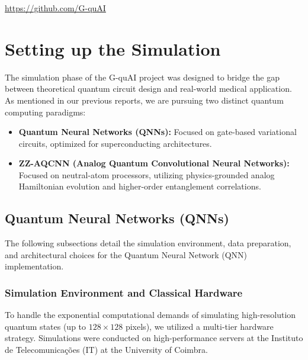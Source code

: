 \documentclass{oqireport}
\begin{document}
    \url {https://github.com/G-quAI}

\section{Setting up the Simulation}

The simulation phase of the G-quAI project was designed to bridge the gap between theoretical quantum circuit design and real-world medical application.\\
As mentioned in our previous reports, we are pursuing two distinct quantum computing paradigms:
\begin{itemize}
    \item \textbf{Quantum Neural Networks (QNNs):} Focused on gate-based variational circuits, optimized for superconducting architectures.
    \item \textbf{ZZ-AQCNN (Analog Quantum Convolutional Neural Networks):} Focused on neutral-atom processors, utilizing physics-grounded analog Hamiltonian evolution and higher-order entanglement correlations.
\end{itemize}

\subsection{Quantum Neural Networks (QNNs)}
The following subsections detail the simulation environment, data preparation, and architectural choices for the Quantum Neural Network (QNN) implementation.

\subsubsection{Simulation Environment and Classical Hardware}
To handle the exponential computational demands of simulating high-resolution quantum states (up to $128 \times 128$ pixels), we utilized a multi-tier hardware strategy. Simulations were conducted on high-performance servers at the Instituto de Telecomunicações (IT) at the University of Coimbra.
\end{document}
